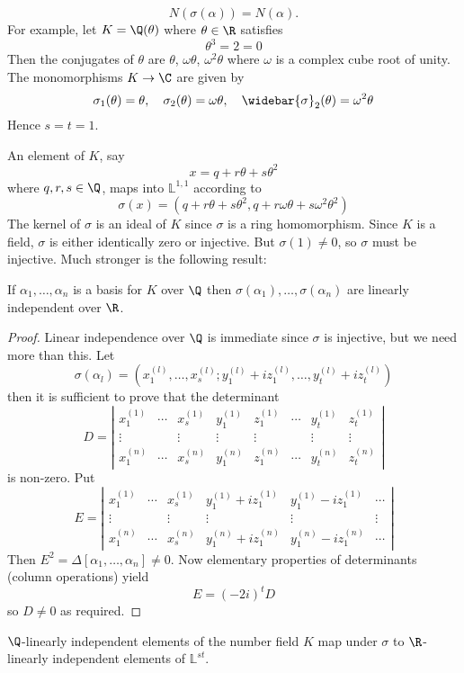 \[N(\sigma(\alpha))=N(\alpha).\]
For example, let $K=\Q(\theta)$ where $\theta\in\R$ satisfies
\[\theta^3=2=0\]
Then the conjugates of $\theta$ are $\theta$, $\omega\theta$, $\omega^2\theta$ where $\omega$ is a complex cube root of unity. The monomorphisms $K\to\C$ are given by
\[\sigma_1(\theta)=\theta,\quad\sigma_2(\theta)=\omega\theta,\quad\widebar{\sigma}_2(\theta)=\omega^2\theta\]
Hence $s=t=1$.\par
An element of $K$, say
\[x=q+r\theta+s\theta^2\]
where $q,r,s\in\Q$, maps into $\mathbb{L}^{1,1}$ according to
\[\sigma(x)=(q+r\theta+s\theta^2,q+r\omega\theta+s\omega^2\theta^2)\]
The kernel of $\sigma$ is an ideal of $K$ since $\sigma$ is a ring homomorphism. Since $K$ is a field, $\sigma$ is either identically zero or injective. But $\sigma(1)\neq 0$, so $\sigma$ must be injective. Much stronger is the following result:
\begin{proposition}\label{alg int L^{st} inde}
If $\alpha_1,\dots,\alpha_n$ is a basis for $K$ over $\Q$ then $\sigma(\alpha_1),\dots,\sigma(\alpha_n)$ are linearly independent over $\R$.
\end{proposition}
\begin{proof}
Linear independence over $\Q$ is immediate since $\sigma$ is injective, but we need more than this. Let
\[\sigma(\alpha_l)=(x_1^{(l)},\dots,x_s^{(l)};y_1^{(l)}+iz_1^{(l)},\dots,y_t^{(l)}+iz_t^{(l)})\]
then it is sufficient to prove that the determinant
\[D=\left|\begin{array}{cccccccc}
x_1^{(1)}&\cdots&x_s^{(1)}&y_1^{(1)}&z_1^{(1)}&\cdots&y_t^{(1)}&z_t^{(1)}\\
\vdots& &\vdots&\vdots&\vdots& &\vdots&\vdots\\
x_1^{(n)}&\cdots&x_s^{(n)}&y_1^{(n)}&z_1^{(n)}&\cdots&y_t^{(n)}&z_t^{(n)}
\end{array}\right|\]
is non-zero. Put
\[E=\left|\begin{array}{cccccccc}
x_1^{(1)}&\cdots&x_s^{(1)}&y_1^{(1)}+iz_1^{(1)}&y_1^{(1)}-iz_1^{(1)}&\cdots\\
\vdots& &\vdots&\vdots&\vdots&\vdots\\
x_1^{(n)}&\cdots&x_s^{(n)}&y_1^{(n)}+iz_1^{(n)}&y_1^{(n)}-iz_1^{(n)}&\cdots
\end{array}\right|\]
Then $E^2=\Delta[\alpha_1,\dots,\alpha_n]\neq 0$. Now elementary properties of determinants (column operations) yield
\[E=(-2i)^tD\]
so $D\neq 0$ as required.
\end{proof}
\begin{corollary}
$\Q$-linearly independent elements of the number field $K$ map under $\sigma$ to $\R$-linearly independent elements of $\mathbb{L}^{st}$.
\end{corollary}
